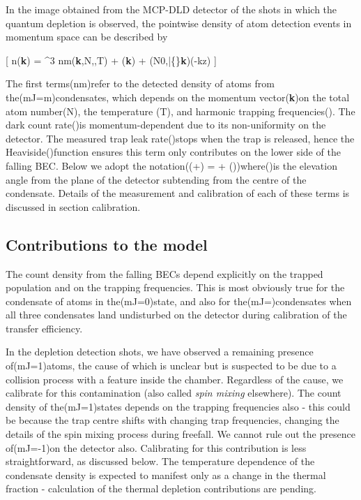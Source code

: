 In the image obtained from the MCP-DLD detector of the shots in which
the quantum depletion is observed, the pointwise density of atom
detection events in momentum space can be described by

{[} n(\textbf{k}) = \^{}3 nm(\textbf{k},N,,T) +
\delta(\textbf{k}) + \lambda(N0,\bar\{\omega\}\textbf{k})\Theta(-kz) {]}

The first terms(nm)refer to the detected density of atoms from
the(mJ=m)condensates, which depends on the momentum vector(\textbf{k})on
the total atom number(N), the temperature (T), and harmonic trapping
frequencies(). The dark count rate(\delta)is
momentum-dependent due to its non-uniformity on the detector. The
measured trap leak rate(\lambda)stops when the trap is released, hence
the Heaviside(\Theta)function ensures this term only contributes on the
lower side of the falling BEC. Below we adopt the
notation((\delta+\lambda) = \delta +
\lambda\Theta(\theta))where(\theta)is the elevation angle from the plane
of the detector subtending from the centre of the condensate. Details of
the measurement and calibration of each of these terms is discussed in
section calibration.

\hypertarget{contributions-to-the-model}{%
\subsection{Contributions to the
model}\label{contributions-to-the-model}}

The count density from the falling BECs depend explicitly on the trapped
population and on the trapping frequencies. This is most obviously true
for the condensate of atoms in the(mJ=0)state, and also for
the(mJ=)condensates when all three condensates land undisturbed on
the detector during calibration of the transfer efficiency.

In the depletion detection shots, we have observed a remaining presence
of(mJ=1)atoms, the cause of which is unclear but is suspected to be due
to a collision process with a feature inside the chamber. Regardless of
the cause, we calibrate for this contamination (also called
\textit{spin mixing} elsewhere). The count density of the(mJ=1)states
depends on the trapping frequencies also - this could be because the
trap centre shifts with changing trap frequencies, changing the details
of the spin mixing process during freefall. We cannot rule out the
presence of(mJ=-1)on the detector also. Calibrating for this
contribution is less straightforward, as discussed below. The
temperature dependence of the condensate density is expected to manifest
only as a change in the thermal fraction - calculation of the thermal
depletion contributions are pending.

